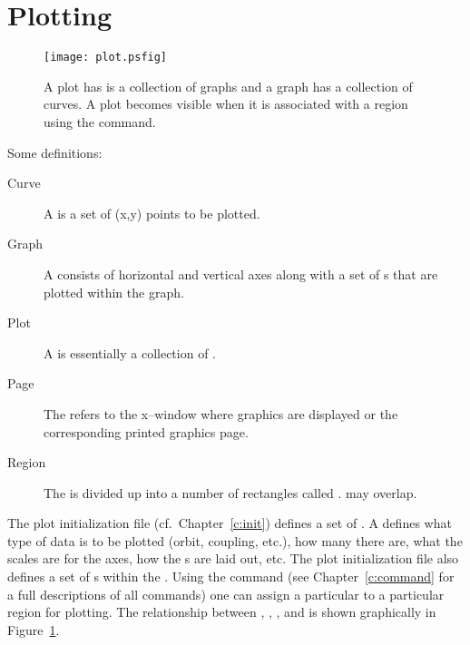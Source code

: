 \section{Plotting}

\begin{figure}
  \centering
  \texttt{[image: plot.psfig]}
  \caption{A plot has is a collection of graphs and a graph has a 
collection of curves. A plot becomes visible when it 
is associated with a region using the  command.}
  \label{f:plot}
\end{figure}

Some definitions:
  \vspace*{-3ex}
\begin{description}
\item[Curve] \Newline
A  is a set of (x,y) points to be plotted.
\item[Graph] \Newline
A  consists of horizontal and vertical axes along with a set
of s that are plotted within the graph. 
\item[Plot] \Newline
A  is essentially a collection of .
\item[Page] \Newline
The  refers to the x--window where graphics are displayed or the 
corresponding printed graphics page.
\item[Region] \Newline
The  is divided up into a number of rectangles called
.  may overlap.
\end{description}

The plot initialization file (cf.~Chapter~\ref{c:init}) defines a set
of . A  defines what type of data is
to be plotted (orbit, coupling, etc.), how many  there are,
what the scales are for the  axes, how the s are
laid out, etc.  The plot initialization file also defines a set of
s within the .  Using the  command  
(see Chapter~\ref{c:command} for a full descriptions of all commands) one
can assign a particular  to a particular region for plotting.
The relationship between , , , and
 is shown graphically in Figure~\ref{f:plot}.


